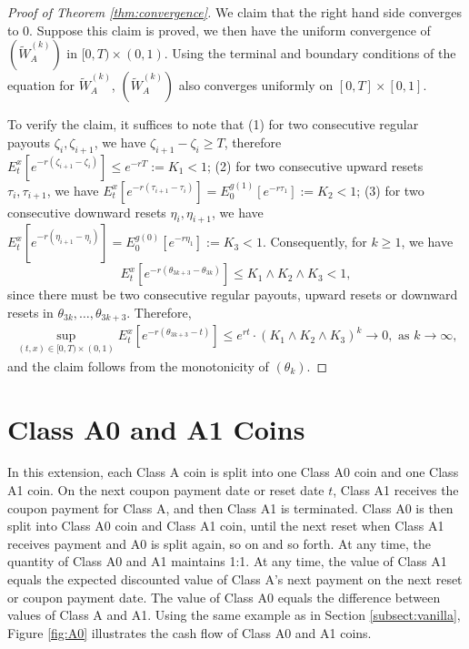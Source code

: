 \documentclass[11pt]{article}%
\numberwithin{equation}{section}
\theoremstyle{plain}
\begin{document}
\begin{appendices}
\begin{proof}[Proof of Theorem \ref{thm:convergence}]
	We claim that the right hand side converges to 0. Suppose this claim is proved, we then have the uniform convergence of $(\tilde{W}_A^{(k)})$ in $[0,T)\times(0,1)$. Using the terminal and boundary conditions of the equation for $\tilde{W}_A^{(k)}$,  $(\tilde{W}_A^{(k)})$ also converges uniformly on $[0,T]\times[0,1]$.

	To verify the claim, it suffices to note that (1) for two consecutive regular payouts $\zeta_i,\zeta_{i+1}$, we have $\zeta_{i+1}-\zeta_{i}\ge T$, therefore $E_t^x\left[e^{-r(\zeta_{i+1}-\zeta_i)}\right]\le e^{-rT}:=K_1<1$; (2) for two consecutive upward resets $\tau_i,\tau_{i+1}$, we have $E_t^x\left[e^{-r(\tau_{i+1}-\tau_i)}\right]=E_0^{g(1)}\left[e^{-r\tau_1}\right]:=K_2<1$; (3) for two consecutive downward resets $\eta_i,\eta_{i+1}$, we have $E_t^x\left[e^{-r(\eta_{i+1}-\eta_i)}\right]=E_0^{g(0)}\left[e^{-r\eta_1}\right]:=K_3<1$. Consequently, for $k\ge 1$, we have $$E_t^x\left[e^{-r(\theta_{3k+3}-\theta_{3k})}\right]\le K_1\land K_2\land K_3<1,$$
	since there must be two consecutive regular payouts, upward resets or downward resets in $\theta_{3k},\ldots,\theta_{3k+3}$. Therefore,
	\begin{align*}
		\sup_{(t,x)\in[0,T)\times(0,1)} E_t^x\left[e^{-r(\theta_{3k+3}-t)}\right]\le e^{rt}\cdot(K_1\land K_2\land K_3)^k\to 0,\text{ as }k\to\infty,
	\end{align*}
	and the claim follows from the monotonicity of $(\theta_k)$.
\end{proof}


\section{Class A0 and A1 Coins}\label{sect:A0}

In this extension, each Class A coin is split into one Class A0 coin and one Class A1 coin. On the next coupon payment date or reset date $t$, Class A1 receives the coupon payment for Class A, and then Class A1 is terminated. Class A0 is then split into Class A0 coin and Class A1 coin, until the next reset when Class A1 receives payment and A0 is split again, so on and so forth. At any time, the quantity of Class A0 and A1 maintains 1:1. At any time, the value of Class A1 equals the expected discounted value of Class A's next payment on the next reset or coupon payment date. The value of Class A0 equals the difference between values of Class A and A1. Using the same example as in Section \ref{subsect:vanilla}, Figure \ref{fig:A0} illustrates the cash flow of Class A0 and A1 coins.


\end{appendices}
\end{document}
